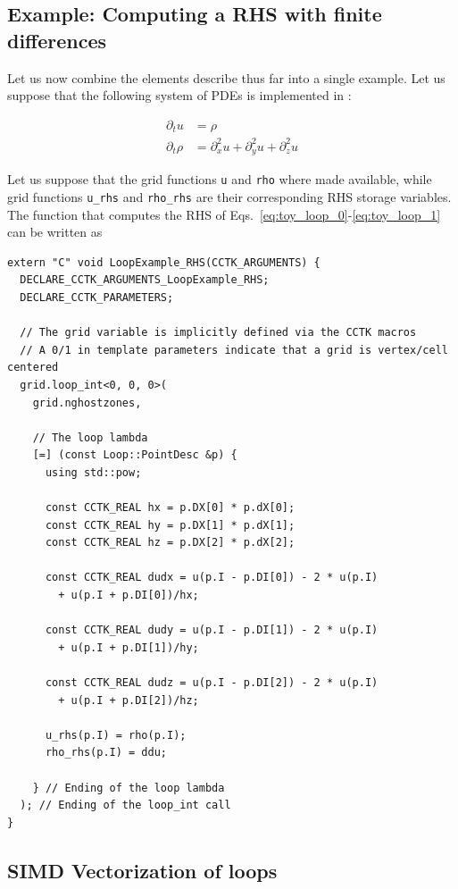 \subsection{Example: Computing a RHS with finite differences}

Let us now combine the elements describe thus far into a single example. Let us suppose that the following system of PDEs is implemented in \Cactus:

\begin{align}
  \partial_t u & = \rho \label{eq:toy_loop_0}\\
  \partial_t \rho & = \partial_x^2 u + \partial_y^2 u + \partial_z^2 u \label{eq:toy_loop_1}
\end{align}

Let us suppose that the grid functions \texttt{u} and \texttt{rho} where made available, while grid functions \texttt{u\_rhs} and \texttt{rho\_rhs} are their corresponding RHS storage variables. The function that computes the RHS of Eqs.~\eqref{eq:toy_loop_0}-\eqref{eq:toy_loop_1} can be written as

\begin{lstlisting}
extern "C" void LoopExample_RHS(CCTK_ARGUMENTS) {
  DECLARE_CCTK_ARGUMENTS_LoopExample_RHS;
  DECLARE_CCTK_PARAMETERS;

  // The grid variable is implicitly defined via the CCTK macros
  // A 0/1 in template parameters indicate that a grid is vertex/cell centered
  grid.loop_int<0, 0, 0>(
    grid.nghostzones,

    // The loop lambda
    [=] (const Loop::PointDesc &p) {
      using std::pow;

      const CCTK_REAL hx = p.DX[0] * p.dX[0];
      const CCTK_REAL hy = p.DX[1] * p.dX[1];
      const CCTK_REAL hz = p.DX[2] * p.dX[2];
      
      const CCTK_REAL dudx = u(p.I - p.DI[0]) - 2 * u(p.I) 
        + u(p.I + p.DI[0])/hx;

      const CCTK_REAL dudy = u(p.I - p.DI[1]) - 2 * u(p.I) 
        + u(p.I + p.DI[1])/hy;

      const CCTK_REAL dudz = u(p.I - p.DI[2]) - 2 * u(p.I) 
        + u(p.I + p.DI[2])/hz;

      u_rhs(p.I) = rho(p.I);
      rho_rhs(p.I) = ddu;

    } // Ending of the loop lambda
  ); // Ending of the loop_int call
}
\end{lstlisting}

\subsection{SIMD Vectorization of loops}

